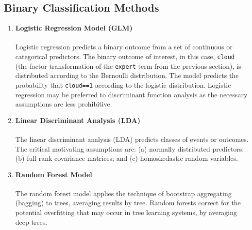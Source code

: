 \documentclass[11pt]{article}
\begin{document}
\subsection{Binary Classification Methods}
\begin{enumerate}
\item[]{\bf Logistic Regression Model (GLM)}\\
\\
Logistic regression predicts a binary outcome from a set of continuous or categorical predictors. The binary outcome of interest, in this case, \texttt{cloud} (the factor transformation of the \texttt{expert} term from the previous section), is distributed according to the Bernoulli distribution. The model predicts the probability that \texttt{cloud==1} according to the logistic distribution.  Logistic regression may be preferred to discriminant function analysis as the necessary assumptions are less prohibitive. 
\newpage
\item[]{\bf Linear Discriminant Analysis (LDA)} \\
\\
The linear discriminant analysis (LDA) predicts classes of events or outcomes. The critical motivating assumptions are: (a) normally distributed predictors; (b) full rank covariance matrices; and (c) homoskedastic random variables. 
\item[]{\bf Random Forest Model }\\
\\
The random forest model applies the technique of bootstrap aggregating (bagging) to trees, averaging results by tree.  Random forests correct for the potential overfitting that may occur in tree learning systems, by averaging deep trees.  
\end{enumerate}
\end{document}
